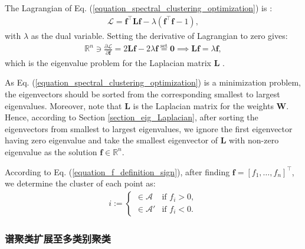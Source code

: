\documentclass[lang=cn,10pt]{gorgeousnbook}
\numberwithin{equation}{section}%
\numberwithin{figure}{section}%
\begin{document}
The Lagrangian of Eq. (\ref{equation_spectral_clustering_optimization}) is \cite{boyd2004convex}:
\begin{align*}
\mathcal{L} = \boldsymbol{f}^\top \boldsymbol{L} \boldsymbol{f} - \lambda (\boldsymbol{f}^\top \boldsymbol{f} - 1),
\end{align*}
with $\lambda$ as the dual variable. Setting the derivative of Lagrangian to zero gives:
\begin{align}
\mathbb{R}^n \ni \frac{\partial \mathcal{L}}{\partial \boldsymbol{f}} = 2 \boldsymbol{L} \boldsymbol{f} - 2 \lambda \boldsymbol{f} \overset{\text{set}}{=} \boldsymbol{0} \implies \boldsymbol{L} \boldsymbol{f} = \lambda \boldsymbol{f},
\end{align}
which is the eigenvalue problem for the Laplacian matrix $\boldsymbol{L}$ \cite{ghojogh2019eigenvalue}. 

As Eq. (\ref{equation_spectral_clustering_optimization}) is a minimization problem, the eigenvectors should be sorted from the corresponding smallest to largest eigenvalues.
Moreover, note that $\boldsymbol{L}$ is the Laplacian matrix for the weights $\boldsymbol{W}$.
Hence, according to Section \ref{section_eig_Laplacian}, after sorting the eigenvectors from smallest to largest eigenvalues, we ignore the first eigenvector having zero eigenvalue and take the smallest eigenvector of $\boldsymbol{L}$ with non-zero eigenvalue as the solution $\boldsymbol{f} \in \mathbb{R}^n$. 

According to Eq. (\ref{equation_f_definition_sign}), after finding $\boldsymbol{f} = [f_1, \dots, f_n]^\top$, we determine the cluster of each point as:
\begin{align}
i := 
\left\{
    \begin{array}{ll}
        \in \mathcal{A} & \mbox{if } f_i > 0, \\
        \in \mathcal{A}' & \mbox{if } f_i < 0.
    \end{array}
\right.
\end{align}

\subsubsection{谱聚类扩展至多类别聚类}\label{section_spectral_clustering_multipleClusters}
\end{document}
